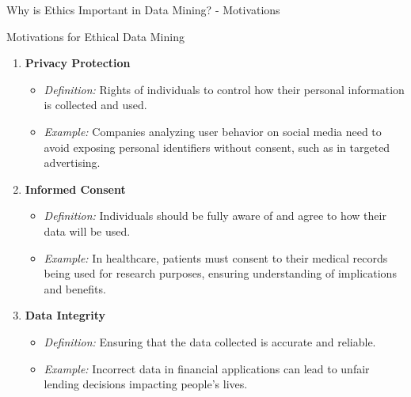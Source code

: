 \documentclass[aspectratio=169]{beamer}
\begin{document}
\begin{frame}[fragile]{Why is Ethics Important in Data Mining? - Motivations}
    \begin{block}{Motivations for Ethical Data Mining}
        \begin{enumerate}
            \item \textbf{Privacy Protection}
            \begin{itemize}
                \item \textit{Definition:} Rights of individuals to control how their personal information is collected and used.
                \item \textit{Example:} Companies analyzing user behavior on social media need to avoid exposing personal identifiers without consent, such as in targeted advertising.
            \end{itemize}

            \item \textbf{Informed Consent}
            \begin{itemize}
                \item \textit{Definition:} Individuals should be fully aware of and agree to how their data will be used.
                \item \textit{Example:} In healthcare, patients must consent to their medical records being used for research purposes, ensuring understanding of implications and benefits.
            \end{itemize}

            \item \textbf{Data Integrity}
            \begin{itemize}
                \item \textit{Definition:} Ensuring that the data collected is accurate and reliable.
                \item \textit{Example:} Incorrect data in financial applications can lead to unfair lending decisions impacting people's lives.
            \end{itemize}
        \end{enumerate}
    \end{block}
\end{frame}
\end{document}
